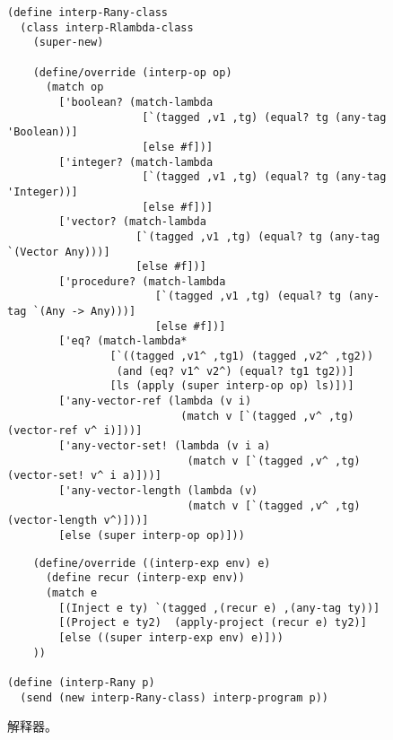 \documentclass[11pt]{book}
\begin{document}
\begin{figure}[btp]
\begin{lstlisting}
(define interp-Rany-class
  (class interp-Rlambda-class
    (super-new)

    (define/override (interp-op op)
      (match op
        ['boolean? (match-lambda
                     [`(tagged ,v1 ,tg) (equal? tg (any-tag 'Boolean))]
                     [else #f])]
        ['integer? (match-lambda
                     [`(tagged ,v1 ,tg) (equal? tg (any-tag 'Integer))]
                     [else #f])]
        ['vector? (match-lambda
                    [`(tagged ,v1 ,tg) (equal? tg (any-tag `(Vector Any)))]
                    [else #f])]
        ['procedure? (match-lambda
                       [`(tagged ,v1 ,tg) (equal? tg (any-tag `(Any -> Any)))]
                       [else #f])]
        ['eq? (match-lambda*
                [`((tagged ,v1^ ,tg1) (tagged ,v2^ ,tg2))
                 (and (eq? v1^ v2^) (equal? tg1 tg2))]
                [ls (apply (super interp-op op) ls)])]
        ['any-vector-ref (lambda (v i)
                           (match v [`(tagged ,v^ ,tg) (vector-ref v^ i)]))]
        ['any-vector-set! (lambda (v i a)
                            (match v [`(tagged ,v^ ,tg) (vector-set! v^ i a)]))]
        ['any-vector-length (lambda (v)
                            (match v [`(tagged ,v^ ,tg) (vector-length v^)]))]
        [else (super interp-op op)]))
\end{lstlisting}
\end{figure}
\begin{figure}[tbp]
\begin{lstlisting}
    (define/override ((interp-exp env) e)
      (define recur (interp-exp env))
      (match e
        [(Inject e ty) `(tagged ,(recur e) ,(any-tag ty))]
        [(Project e ty2)  (apply-project (recur e) ty2)]
        [else ((super interp-exp env) e)]))
    ))

(define (interp-Rany p)
  (send (new interp-Rany-class) interp-program p))
\end{lstlisting}
\caption{ \LangAny{} 解释器。}
\label{fig:interp-Rany}
\end{figure}
\end{document}

